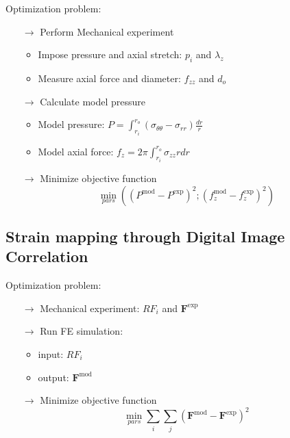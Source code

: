 \documentclass[../main.tex]{subfiles}
\begin{document}
Optimization problem:
\begin{itemize}
    \item[$\rightarrow$] Perform Mechanical experiment
    \begin{itemize}
        \item Impose pressure and axial stretch: $p_i$ and $\lambda_z$
        \item Measure axial force and diameter: $f_{zz}$ and $d_o$
    \end{itemize}
    \item[$\rightarrow$] Calculate model pressure
    \begin{itemize}
        \item Model pressure: $P = \int_{r_i}^{r_o} (\sigma_{\theta\theta} - \sigma_{rr})\frac{dr}{r}$
        \item Model axial force: $f_z = 2\pi\int_{r_i}^{r_o}\sigma_{zz}rdr$
    \end{itemize}
    \item[$\rightarrow$] Minimize objective function
    \begin{equation}
        \min_{pars}\left((P^{\text{mod}}-P^{\text{exp}})^2; (f_z^{\text{mod}}-f_z^{\text{exp}})^2\right)
    \end{equation}
\end{itemize}

\subsection{Strain mapping through Digital Image Correlation}

Optimization problem:
\begin{itemize}
    \item[$\rightarrow$] Mechanical experiment: $RF_i$ and $\textbf{F}^{\text{exp}}$
    \item[$\rightarrow$] Run FE simulation:
    \begin{itemize}
        \item input: $RF_i$
        \item output: $\textbf{F}^{\text{mod}}$
    \end{itemize}
    \item[$\rightarrow$] Minimize objective function
    \begin{equation}
        \min_{pars}\sum_i\sum_j\left(\textbf{F}^{\text{mod}}-\textbf{F}^{\text{exp}}\right)^2
    \end{equation}
\end{itemize}
\end{document}
